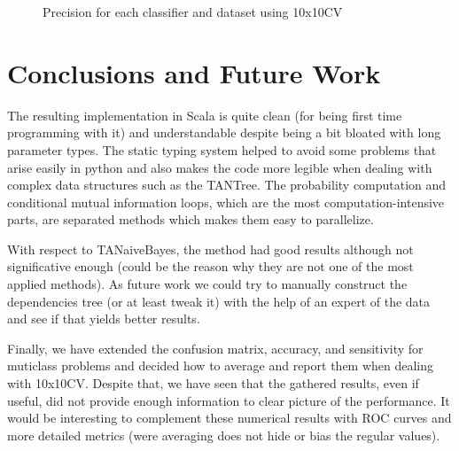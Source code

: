 \documentclass[a4paper,10pt]{article}
\begin{document}
\begin{figure}[H]
\caption{Precision for each classifier and dataset using 10x10CV}
\label{fig:precision}
\end{figure}

\section{Conclusions and Future Work}

The resulting implementation in Scala is quite clean (for being first time programming with it) and understandable despite being a bit bloated with long parameter types. The static typing system helped to avoid some problems that arise easily in python and also makes the code more legible when dealing with complex data structures such as the TANTree. The probability computation and conditional mutual information loops, which are the most computation-intensive parts, are separated methods which makes them easy to parallelize. 

With respect to TANaiveBayes, the method had good results although not significative enough (could be the reason why they are not one of the most applied methods). As future work we could try to manually construct the dependencies tree (or at least tweak it) with the help of an expert of the data and see if that yields better results. 

Finally, we have extended the confusion matrix, accuracy, and sensitivity for muticlass problems and decided how to average and report them when dealing with 10x10CV. Despite that, we have seen that the gathered results, even if useful, did not provide enough information to clear picture of the performance. It would be interesting to complement these numerical results with ROC curves and more detailed metrics (were averaging does not hide or bias the regular values). 

 

\end{document}
